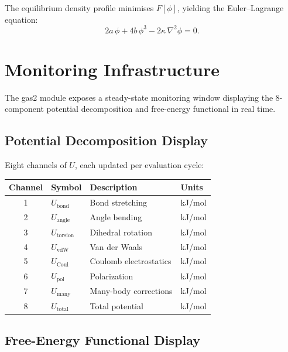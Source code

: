 \documentclass[11pt]{article}
\begin{document}
The equilibrium density profile minimises $F[\phi]$, yielding the
Euler--Lagrange equation:
\begin{equation}
  2a\,\phi + 4b\,\phi^3 - 2\kappa\,\nabla^2\phi = 0.
  \label{eq:euler_lagrange}
\end{equation}


\section{Monitoring Infrastructure}

The gas2 module exposes a steady-state monitoring window displaying
the 8-component potential decomposition and free-energy functional
in real time.

\subsection{Potential Decomposition Display}

Eight channels of $U$, each updated per evaluation cycle:
\begin{center}
\begin{tabular}{clll}
  \toprule
  Channel & Symbol & Description & Units \\
  \midrule
  1 & $U_\mathrm{bond}$      & Bond stretching        & kJ/mol \\
  2 & $U_\mathrm{angle}$     & Angle bending          & kJ/mol \\
  3 & $U_\mathrm{torsion}$   & Dihedral rotation      & kJ/mol \\
  4 & $U_\mathrm{vdW}$       & Van der Waals          & kJ/mol \\
  5 & $U_\mathrm{Coul}$      & Coulomb electrostatics & kJ/mol \\
  6 & $U_\mathrm{pol}$       & Polarization           & kJ/mol \\
  7 & $U_\mathrm{many}$      & Many-body corrections  & kJ/mol \\
  8 & $U_\mathrm{total}$     & Total potential         & kJ/mol \\
  \bottomrule
\end{tabular}
\end{center}

\subsection{Free-Energy Functional Display}
\end{document}
